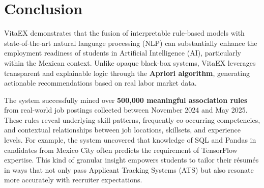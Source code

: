 \documentclass[runningheads]{llncs}
\begin{document}
%	
%	

\section{Conclusion}

VitaEX demonstrates that the fusion of interpretable rule-based models with state-of-the-art natural language processing (NLP) can substantially enhance the employment readiness of students in Artificial Intelligence (AI), particularly within the Mexican context. Unlike opaque black-box systems, VitaEX leverages transparent and explainable logic through the \textbf{Apriori algorithm}, generating actionable recommendations based on real labor market data.

The system successfully mined over \textbf{500,000 meaningful association rules} from real-world job postings collected between November 2024 and May 2025. These rules reveal underlying skill patterns, frequently co-occurring competencies, and contextual relationships between job locations, skillsets, and experience levels. For example, the system uncovered that knowledge of SQL and Pandas in candidates from Mexico City often predicts the requirement of TensorFlow expertise. This kind of granular insight empowers students to tailor their résumés in ways that not only pass Applicant Tracking Systems (ATS) but also resonate more accurately with recruiter expectations.
\end{document}
